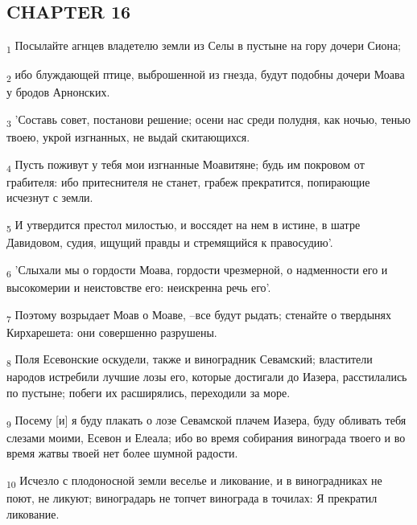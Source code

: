 \subsection{CHAPTER 16}
\begin{tcolorbox}
\textsubscript{1} Посылайте агнцев владетелю земли из Селы в пустыне на гору дочери Сиона;
\end{tcolorbox}
\begin{tcolorbox}
\textsubscript{2} ибо блуждающей птице, выброшенной из гнезда, будут подобны дочери Моава у бродов Арнонских.
\end{tcolorbox}
\begin{tcolorbox}
\textsubscript{3} 'Составь совет, постанови решение; осени нас среди полудня, как ночью, тенью твоею, укрой изгнанных, не выдай скитающихся.
\end{tcolorbox}
\begin{tcolorbox}
\textsubscript{4} Пусть поживут у тебя мои изгнанные Моавитяне; будь им покровом от грабителя: ибо притеснителя не станет, грабеж прекратится, попирающие исчезнут с земли.
\end{tcolorbox}
\begin{tcolorbox}
\textsubscript{5} И утвердится престол милостью, и воссядет на нем в истине, в шатре Давидовом, судия, ищущий правды и стремящийся к правосудию'.
\end{tcolorbox}
\begin{tcolorbox}
\textsubscript{6} 'Слыхали мы о гордости Моава, гордости чрезмерной, о надменности его и высокомерии и неистовстве его: неискренна речь его'.
\end{tcolorbox}
\begin{tcolorbox}
\textsubscript{7} Поэтому возрыдает Моав о Моаве, --все будут рыдать; стенайте о твердынях Кирхарешета: они совершенно разрушены.
\end{tcolorbox}
\begin{tcolorbox}
\textsubscript{8} Поля Есевонские оскудели, также и виноградник Севамский; властители народов истребили лучшие лозы его, которые достигали до Иазера, расстилались по пустыне; побеги их расширялись, переходили за море.
\end{tcolorbox}
\begin{tcolorbox}
\textsubscript{9} Посему [и] я буду плакать о лозе Севамской плачем Иазера, буду обливать тебя слезами моими, Есевон и Елеала; ибо во время собирания винограда твоего и во время жатвы твоей нет более шумной радости.
\end{tcolorbox}
\begin{tcolorbox}
\textsubscript{10} Исчезло с плодоносной земли веселье и ликование, и в виноградниках не поют, не ликуют; виноградарь не топчет винограда в точилах: Я прекратил ликование.
\end{tcolorbox}
